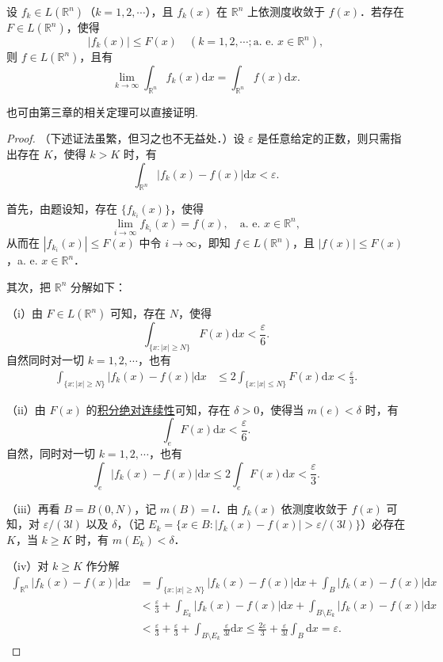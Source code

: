 \documentclass[../../main.tex]{subfiles}
\begin{document}
\begin{theorem}[依测度收敛型控制收敛定理]\label{theorem:依测度收敛型控制收敛定理}
设 \( f_k \in L(\mathbb{R}^n) \)（\( k = 1,2,\cdots \)），且 \( f_k(x) \) 在 \( \mathbb{R}^n \) 上依测度收敛于 \( f(x) \)．若存在 \( F \in L(\mathbb{R}^n) \)，使得
\[
|f_k(x)| \leqslant F(x) \quad (k = 1,2,\cdots; \text{a. e. } x \in \mathbb{R}^n),
\]
则 \( f \in L(\mathbb{R}^n) \)，且有
\[
\lim_{k \to \infty} \int_{\mathbb{R}^n} f_k(x) \mathrm{d}x = \int_{\mathbb{R}^n} f(x) \mathrm{d}x.
\]
\end{theorem}
\begin{remark}
也可由第三章的相关定理可以直接证明.
\end{remark}
\begin{proof}
（下述证法虽繁，但习之也不无益处．）设 \( \varepsilon \) 是任意给定的正数，则只需指出存在 \( K \)，使得 \( k > K \) 时，有
\[
\int_{\mathbb{R}^n} |f_k(x) - f(x)| \mathrm{d}x < \varepsilon.
\]

首先，由题设知，存在 \( \{ f_{k_i}(x) \} \)，使得
\[
\lim_{i \to \infty} f_{k_i}(x) = f(x), \quad \text{a. e. } x \in \mathbb{R}^n,
\]
从而在 \( |f_{k_i}(x)| \leqslant F(x) \) 中令 \( i \to \infty \)，即知 \( f \in L(\mathbb{R}^n) \)，且 \( |f(x)| \leqslant F(x) \)，a. e. \( x \in \mathbb{R}^n \)．

其次，把 \( \mathbb{R}^n \) 分解如下：

（i）由 \( F \in L(\mathbb{R}^n) \) 可知，存在 \( N \)，使得
\[
\int_{\{ x : |x| \geqslant N \}} F(x) \mathrm{d}x < \frac{\varepsilon}{6}.
\]
自然同时对一切 \( k = 1,2,\cdots \)，也有
\begin{align*}
\int_{\{ x : |x| \geqslant N \}} |f_k(x) - f(x)| \mathrm{d}x &\leqslant 2 \int_{\{ x : |x| \leqslant N \}} F(x) \mathrm{d}x < \frac{\varepsilon}{3}.
\end{align*}

（ii）由 \( F(x) \) 的\hyperref[theorem:积分的绝对连续性]{积分绝对连续性}可知，存在 \( \delta > 0 \)，使得当 \( m(e) < \delta \) 时，有
\[
\int_{e} F(x) \mathrm{d}x < \frac{\varepsilon}{6}.
\]
自然，同时对一切 \( k = 1,2,\cdots \)，也有
\[
\int_{e} |f_k(x) - f(x)| \mathrm{d}x \leqslant 2 \int_{e} F(x) \mathrm{d}x < \frac{\varepsilon}{3}.
\]

（iii）再看 \( B = B(0, N) \)，记 \( m(B) = l \)．由 \( f_k(x) \) 依测度收敛于 \( f(x) \) 可知，对 \( \varepsilon/(3l) \) 以及 \( \delta \)，（记 \( E_k = \{ x \in B : |f_k(x) - f(x)| > \varepsilon/(3l) \} \)）必存在 \( K \)，当 \( k \geqslant K \) 时，有 \( m(E_k) < \delta \)．

（iv）对 \( k \geqslant K \) 作分解
\begin{align*}
\int_{\mathbb{R}^n} |f_k(x) - f(x)| \mathrm{d}x &= \int_{\{ x : |x| \geqslant N \}} |f_k(x) - f(x)| \mathrm{d}x + \int_{B} |f_k(x) - f(x)| \mathrm{d}x \\
&< \frac{\varepsilon}{3} + \int_{E_k} |f_k(x) - f(x)| \mathrm{d}x + \int_{B \setminus E_k} |f_k(x) - f(x)| \mathrm{d}x \\
&< \frac{\varepsilon}{3} + \frac{\varepsilon}{3} + \int_{B \setminus E_k} \frac{\varepsilon}{3l} \mathrm{d}x \leqslant \frac{2\varepsilon}{3} + \frac{\varepsilon}{3l} \int_{B} \mathrm{d}x = \varepsilon.
\end{align*}
\end{proof}
\end{document}
